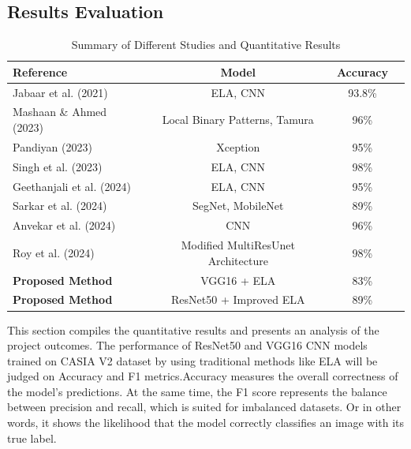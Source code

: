 \documentclass{ieeeaccess}
\begin{document}
	
\subsection{Results Evaluation}
	\begin{table}[h!]
		\centering
		\scriptsize %
		\setlength{\tabcolsep}{4pt} %
		\renewcommand{\arraystretch}{1.2} %
		\begin{tabular}{@{}lccc@{}}
			\toprule
			\textbf{Reference}            & \textbf{Model}                       & \textbf{Accuracy} \\ \midrule
			Jabaar et al.  (2021)      & ELA, CNN                             & 93.8\%                          \\
			Mashaan \& Ahmed  (2023)   & Local Binary Patterns, Tamura        & 96\%                             \\
			Pandiyan  (2023)           & Xception                             & 95\%                               \\
			Singh et al.  (2023)       & ELA, CNN                             & 98\%                              \\
			Geethanjali et al. (2024) & ELA, CNN                             & 95\%                              \\
			Sarkar et al. (2024)      & SegNet, MobileNet                    & 89\%                            \\
			Anvekar et al.  (2024)     & CNN                                  & 96\%                               \\
			Roy et al. (2024)         & Modified MultiResUnet Architecture   & 98\%                               \\ \midrule
			\textbf{Proposed Method}      & VGG16 + ELA                          & 83\%                          \\
			\textbf{Proposed Method}      & ResNet50 + Improved ELA              & 89\%                          \\ \bottomrule
		\end{tabular}
		\caption{Summary of Different Studies and Quantitative Results}
		\label{tab:summary-studies}
	\end{table}
  This section compiles the quantitative results and presents an analysis of the project outcomes. The performance of ResNet50 and VGG16 CNN models trained on CASIA V2 dataset by using traditional methods like ELA will be judged on Accuracy and F1 metrics.Accuracy measures the overall correctness of the model's predictions. At the same time, the F1 score represents the balance between precision and recall, which is suited for imbalanced datasets. Or in other words, it shows the likelihood that the model correctly classifies an image with its true label.
\end{document}
